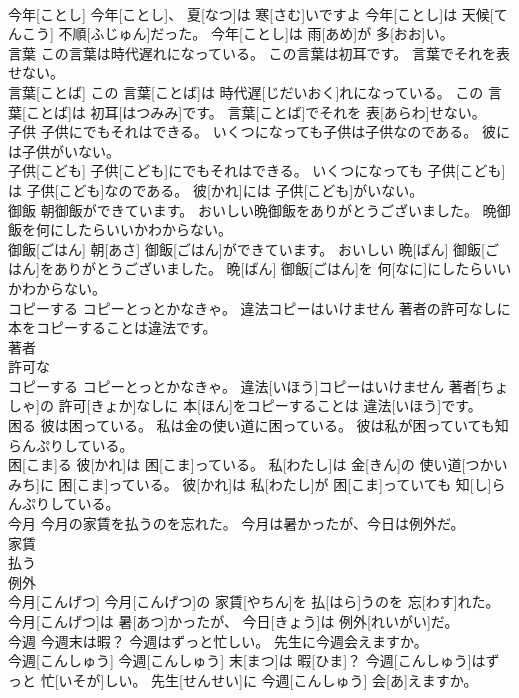 \documentclass[8pt]{extreport}
\begin{document}
\begin{CJK}{UTF8}{min}
\\	今年[ことし] 今年[ことし]、 夏[なつ]は 寒[さむ]いですよ 今年[ことし]は 天候[てんこう] 不順[ふじゅん]だった。 今年[ことし]は 雨[あめ]が 多[おお]い。
\\	言葉 この言葉は時代遅れになっている。 この言葉は初耳です。 言葉でそれを表せない。	
\\	言葉[ことば] この 言葉[ことば]は 時代遅[じだいおく]れになっている。 この 言葉[ことば]は 初耳[はつみみ]です。 言葉[ことば]でそれを 表[あらわ]せない。
\\	子供 子供にでもそれはできる。 いくつになっても子供は子供なのである。 彼には子供がいない。	
\\	子供[こども] 子供[こども]にでもそれはできる。 いくつになっても 子供[こども]は 子供[こども]なのである。 彼[かれ]には 子供[こども]がいない。
\\	御飯 朝御飯ができています。 おいしい晩御飯をありがとうございました。 晩御飯を何にしたらいいかわからない。	
\\	御飯[ごはん] 朝[あさ] 御飯[ごはん]ができています。 おいしい 晩[ばん] 御飯[ごはん]をありがとうございました。 晩[ばん] 御飯[ごはん]を 何[なに]にしたらいいかわからない。
\\	コピーする コピーとっとかなきゃ。 違法コピーはいけません 著者の許可なしに本をコピーすることは違法です。	
\\	著者 
\\	許可な 
\\	コピーする コピーとっとかなきゃ。 違法[いほう]コピーはいけません 著者[ちょしゃ]の 許可[きょか]なしに 本[ほん]をコピーすることは 違法[いほう]です。
\\	困る 彼は困っている。 私は金の使い道に困っている。 彼は私が困っていても知らんぷりしている。	
\\	困[こま]る 彼[かれ]は 困[こま]っている。 私[わたし]は 金[きん]の 使い道[つかいみち]に 困[こま]っている。 彼[かれ]は 私[わたし]が 困[こま]っていても 知[し]らんぷりしている。
\\	今月 今月の家賃を払うのを忘れた。 今月は暑かったが、今日は例外だ。	
\\	家賃 
\\	払う 
\\	例外
\\	今月[こんげつ] 今月[こんげつ]の 家賃[やちん]を 払[はら]うのを 忘[わす]れた。 今月[こんげつ]は 暑[あつ]かったが、 今日[きょう]は 例外[れいがい]だ。
\\	今週 今週末は暇？ 今週はずっと忙しい。 先生に今週会えますか。	
\\	今週[こんしゅう] 今週[こんしゅう] 末[まつ]は 暇[ひま]？ 今週[こんしゅう]はずっと 忙[いそが]しい。 先生[せんせい]に 今週[こんしゅう] 会[あ]えますか。

\end{CJK}
\end{document}
